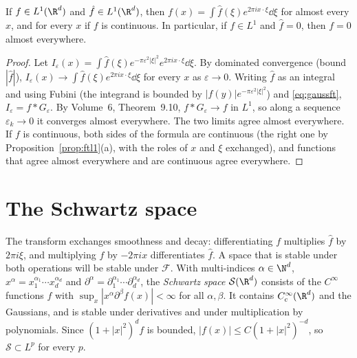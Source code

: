 \begin{theorem}\label{thm:ftinv}
If $f\in L^1(\R^d)$ and $\hat f\in L^1(\R^d)$, then $f(x)=\int\hat f(\xi)e^{2\pi ix\cdot\xi}\dd\xi$ for almost every $x$, and for every $x$ if $f$ is continuous. In particular, if $f\in L^1$ and $\hat f=0$, then $f=0$ almost
everywhere.
\end{theorem}
\begin{proof}
Let $I_\varepsilon(x)=\int\hat f(\xi)e^{-\pi\varepsilon^2|\xi|^2}e^{2\pi ix\cdot\xi}\dd\xi$. By dominated convergence (bound $|\hat f|$), $I_\varepsilon(x)\to\int\hat f(\xi)e^{2\pi ix\cdot\xi}\dd\xi$ for every $x$ as $\varepsilon\to0$. Writing $\hat f$ as
an integral and using Fubini (the integrand is bounded by $|f(y)|e^{-\pi\varepsilon^2|\xi|^2}$) and \eqref{eq:gaussft}, $I_\varepsilon=f*G_\varepsilon$. By Volume~6, Theorem~9.10, $f*G_\varepsilon\to f$ in $L^1$, so along a sequence
$\varepsilon_k\to0$ it converges almost everywhere. The two limits agree almost everywhere. If $f$ is continuous, both sides of the formula are continuous (the right one by Proposition~\ref{prop:ftl1}(a), with the roles of
$x$ and $\xi$ exchanged), and functions that agree almost everywhere and are continuous agree everywhere.
\end{proof}

\section{The Schwartz space}

The transform exchanges smoothness and decay: differentiating $f$ multiplies $\hat f$ by $2\pi i\xi$, and multiplying $f$ by $-2\pi ix$ differentiates $\hat f$. A space that is
stable under both operations will be stable under $\mathcal F$. With multi-indices $\alpha\in\N^d$, $x^\alpha=x_1^{\alpha_1}\cdots x_d^{\alpha_d}$ and $\partial^\alpha=\partial_1^{\alpha_1}\cdots\partial_d^{\alpha_d}$, the
\emph{Schwartz space} $\mathcal S(\R^d)$ consists of the $C^\infty$ functions $f$ with $\sup_x|x^\alpha\partial^\beta f(x)|<\infty$ for all $\alpha,\beta$. It contains $C_c^\infty(\R^d)$ and the Gaussians, and is stable under
derivatives and under multiplication by polynomials. Since $(1+|x|^2)^{d}f$ is bounded, $|f(x)|\le C(1+|x|^2)^{-d}$, so $\mathcal S\subset L^p$ for every $p$.

